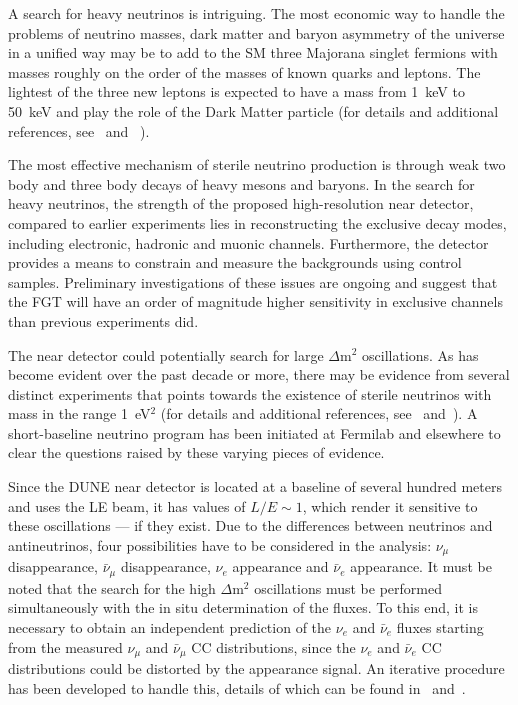{A search for heavy neutrinos is intriguing. 
The most economic way to handle the problems of neutrino masses, dark matter and baryon asymmetry of the universe in a unified way may be to add to the SM three Majorana singlet fermions with masses roughly on the order of the masses of known quarks and leptons. 
 The lightest of the three new leptons is expected to have a mass from 1~keV to 50~keV and play the role of the Dark Matter particle (for details and additional references, see~\cite{DPR} and ~\cite{Adams:2013qkq}).

The most effective  mechanism of sterile neutrino production is through weak two body and three body decays of heavy mesons and baryons. In the search for heavy neutrinos, the strength of the proposed high-resolution near detector, compared to earlier experiments lies in reconstructing the exclusive decay modes, including electronic, hadronic and muonic channels. Furthermore, the detector provides a means to constrain and measure the backgrounds using control samples. Preliminary investigations of these issues are ongoing and  suggest that the FGT  will have an order of magnitude higher sensitivity in exclusive channels than previous experiments did. 


The near detector could potentially search for large $\Delta$m$^2$ oscillations. As has become evident over the past decade or more, there may be evidence from several distinct experiments that points towards the existence of sterile neutrinos with mass in the range 1~eV$^2$ (for details and additional references, see~\cite{DPR} and~\cite{Adams:2013qkq}).  A short-baseline neutrino program has been initiated at Fermilab and elsewhere to clear the questions raised by these varying pieces of evidence.  

Since the DUNE near detector is located at a baseline of several hundred meters and uses the LE beam, it has values of  $L/E \sim 1$, which render it sensitive to these oscillations --- if they exist. Due to the differences between neutrinos and antineutrinos,  four possibilities have to be considered in the analysis: 
$\nu_\mu$ disappearance,  $\bar \nu_\mu$ disappearance, $\nu_e$ appearance and $\bar \nu_e$  appearance. 
It must be noted that  the search for the high
 $\Delta$m$^2$ oscillations must be performed simultaneously with the in situ determination of the fluxes. 
To this end, it is necessary to obtain an independent prediction of the $\nu_e$  and $\bar \nu_e$  fluxes starting from the measured $\nu_\mu$ and  $\bar \nu_\mu$ CC distributions, since the  $\nu_e$  and $\bar \nu_e$ CC distributions could be distorted by the appearance signal. An iterative procedure has been developed to handle this, details of which can be found in~\cite{DPR} and~\cite{Adams:2013qkq}.\\

}
